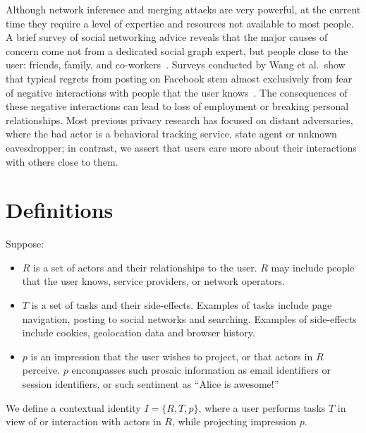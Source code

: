 \documentclass{llncs}
\begin{document}
\begin{comment}TODO: figure out how to cite this. Why is this short
paper's model worth pursuing? It's simpler, and focuses on the user rather
than data.
\end{comment}

Although network inference and merging attacks are very powerful, at the
current time they require a level of expertise and resources not available to
most people. A brief survey of social networking
advice reveals that the
major causes of concern come not from a dedicated social graph expert, but people
close to the user: friends, family, and co-workers~\cite{fbtips2,fbtips1}.
Surveys conducted by Wang et al.~show that typical regrets from posting on
Facebook stem almost exclusively from fear of negative interactions with people
that the user knows~\cite{wang}. The consequences of these negative
interactions can lead to loss of employment or breaking personal relationships.
Most previous privacy research has focused on distant adversaries, where the
bad actor is a behavioral tracking service, state agent or unknown
eavesdropper; in contrast, we assert that users care more about their
interactions with others close to them.

\section{Definitions}

Suppose:
  \begin{itemize}
    \item $R$ is a set of actors and their relationships to the user. $R$ may include people that the user knows, service providers, or network operators.
    \item $T$ is a set of tasks and their side-effects. Examples of tasks
include page navigation, posting to social networks and searching. Examples of
side-effects include cookies, geolocation data and browser history.
    \item $p$ is an impression that the user wishes to project, or that actors
in $R$ perceive. $p$ encompasses such prosaic information as email identifiers
or session identifiers, or such sentiment as ``Alice is awesome!''
  \end{itemize}

\begin{definition} We define a contextual identity $I = \{R,T,p\}$, where a user performs tasks
$T$ in view of or interaction with actors in $R$, while projecting impression
$p$.
\end{definition}
\end{document}
